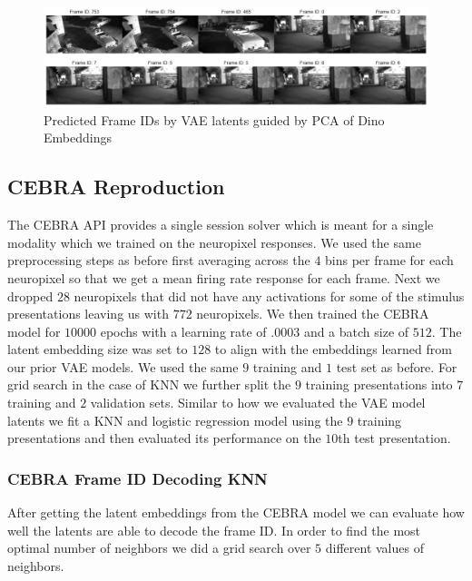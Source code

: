 \documentclass[12pt, letterpaper]{article}
\begin{document}
\begin{figure}[H]
    \centering
    \includegraphics[width=1.0\textwidth]{772_vae_hidden_.9_pca_dino_knn_video.png}
    \caption{Predicted Frame IDs by VAE latents guided by PCA of Dino Embeddings}
    \label{fig:vae_frame_id_decoded_video}
\end{figure}

\subsection{CEBRA Reproduction}
\label{subsec:cebra_reproduction}
The CEBRA API provides a single session solver which is meant for a single modality which we trained on the neuropixel responses. We used the same preprocessing steps as before first averaging across the $4$ bins per frame for each neuropixel so that we get a mean firing rate response for each frame. Next we dropped $28$ neuropixels that did not have any activations for some of the stimulus presentations leaving us with $772$ neuropixels. We then trained the CEBRA model for $10000$ epochs with a learning rate of $.0003$ and a batch size of $512$. The latent embedding size was set to $128$ to align with the embeddings learned from our prior VAE models. We used the same $9$ training and $1$ test set as before. For grid search in the case of KNN we further split the $9$ training presentations into $7$ training and $2$ validation sets. Similar to how we evaluated the VAE model latents we fit a KNN and logistic regression model using the $9$ training presentations and then evaluated its performance on the $10$th test presentation.

\subsubsection{CEBRA Frame ID Decoding KNN}
\label{subsubsec:cebra_frame_id_decoding_knn}
After getting the latent embeddings from the CEBRA model we can evaluate how well the latents are able to decode the frame ID.  In order to find the most optimal number of neighbors we did a grid search over $5$ different values of neighbors. 
\end{document}
